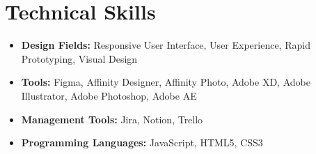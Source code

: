 \section*{Technical Skills}
%
%
%
\begin{itemize}
  \item \textbf{Design Fields:} Responsive User Interface, User Experience, Rapid Prototyping, Visual Design
  \item \textbf{Tools:} Figma, Affinity Designer, Affinity Photo, Adobe XD, Adobe Illustrator, Adobe Photoshop, Adobe AE
  \item \textbf{Management Tools:} Jira, Notion, Trello
  \item \textbf{Programming Languages:} JavaScript, HTML5, CSS3
\end{itemize}